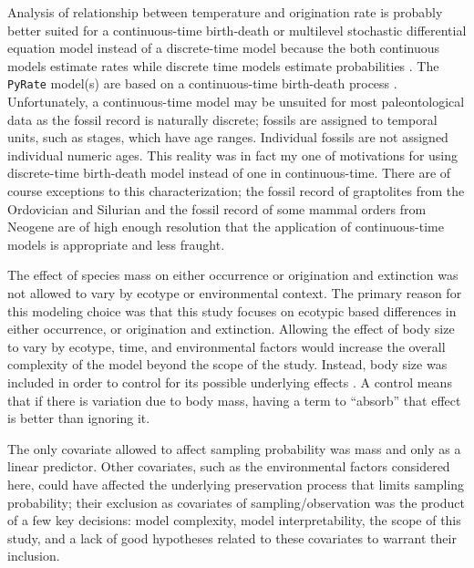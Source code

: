 Analysis of relationship between temperature and origination rate is probably better suited for a continuous-time birth-death or multilevel stochastic differential equation model instead of a discrete-time model because the both continuous models estimate rates while discrete time models estimate probabilities \citep{Allen2011}. The \texttt{PyRate} model(s) are based on a continuous-time birth-death process \citep{Silvestro2014a,Silvestro2015b}. Unfortunately, a continuous-time model may be unsuited for most paleontological data as the fossil record is naturally discrete; fossils are assigned to temporal units, such as stages, which have age ranges. Individual fossils are not assigned individual numeric ages. This reality was in fact my one of motivations for using discrete-time birth-death model instead of one in continuous-time. There are of course exceptions to this characterization; the fossil record of graptolites from the Ordovician and Silurian \citep{Crampton2016a} and the fossil record of some mammal orders from Neogene are of high enough resolution that the application of continuous-time models is appropriate and less fraught.

The effect of species mass on either occurrence or origination and extinction was not allowed to vary by ecotype or environmental context. The primary reason for this modeling choice was that this study focuses on ecotypic based differences in either occurrence, or origination and extinction. Allowing the effect of body size to vary by ecotype, time, and environmental factors would increase the overall complexity of the model beyond the scope of the study. Instead, body size was included in order to control for its possible underlying effects \citep{McElreath2016}. A control means that if there is variation due to body mass, having a term to ``absorb'' that effect is better than ignoring it. %

The only covariate allowed to affect sampling probability was mass and only as a linear predictor. Other covariates, such as the environmental factors considered here, could have affected the underlying preservation process that limits sampling probability; their exclusion as covariates of sampling/observation was the product of a few key decisions: model complexity, model interpretability, the scope of this study, and a lack of good hypotheses related to these covariates to warrant their inclusion. %

